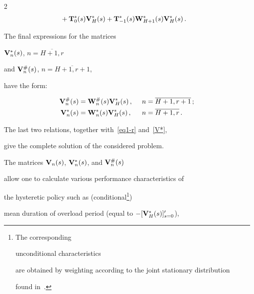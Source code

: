 \begin{multicols}{2}
\begin{align*}
&{}  + 


\bmx{T}^*_0(s) \bmx{V}^*_H(s)


+  \bmx{T}^*_{-1}(s) 


\bmx{W}^*_{H+1}(s)


\bmx{V}^*_{H}(s)\,.




\end{align*}








The final expressions for the matrices


$\mathbf{V}^*_n(s)$, $n=\overline{H+1,r}$


and $\mathbf{V}^{\#}_n(s)$, $n=\overline{H+1,r+1}$,


have the form:


\begin{alignat*}{2}


\bmx{V}^{\#}_{n}(s)


&=  \bmx{W}^{\#}_n(s) 


\bmx{V}^*_{H}(s)\,, &\enskip n&=\overline{H+1,r+1}\,;


\\


\bmx{V}^{*}_{n}(s)


&=  \bmx{W}^{*}_n(s) 


\bmx{V}^*_{H}(s)\,, &\enskip n&=\overline{H+1,r}\,.


\end{alignat*}





The last two relations, together with~\eqref{eq1-r} and~\eqref{V*}, 


give the complete solution of the considered problem.


The matrices $\mathbf{V}_n(s)$, $\mathbf{V}^*_n(s)$, and $\mathbf{V}^{\#}_n(s)$


allow one to calculate various performance characteristics of


the hysteretic policy such as (conditional\footnote{The corresponding 


unconditional characteristics 


are obtained by weighting according to the joint stationary distribution 


found in~\cite{int0}.}) 


mean duration of overload period (equal to $-[\mathbf{V}^*_H(s)]'_{s=0}$),



\end{multicols}
